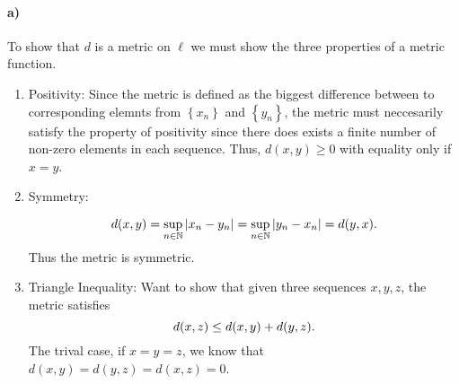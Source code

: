 \documentclass[a4paper]{article}
\begin{document}
\paragraph{a)}

To show that $d$ is a metric on $\ell$ we must show the three properties of a metric function.
\begin{enumerate}
  \item Positivity:
    Since the metric is defined as the biggest difference between to
    corresponding elemnts from $\left\{ x_n \right\}$ and $\left\{ y_n
    \right\}$, the metric must neccesarily satisfy the property of positivity
    since there does exists a finite number of non-zero elements in each sequence.
    Thus, $d(x, y) \geq 0$ with equality only if $x = y$. 
  \item Symmetry:
    
    \begin{equation}
      \notag
      d(x, y) = \sup_{n\in\mathbb{N}} |x_n - y_n| = \sup_{n\in\mathbb{N}}|y_n - x_n| = d(y, x).
    \end{equation}
    Thus the metric is symmetric.

  \item Triangle Inequality:
    Want to show that given three sequences $x, y, z$, the metric satisfies
    \begin{equation}
      \notag
      d(x, z) \leq d(x, y) + d(y, z).
    \end{equation}
    The trival case, if $x = y = z$, we know that $d(x, y) = d(y, z) = d(x, z) = 0$.
\end{enumerate}
\end{document}
